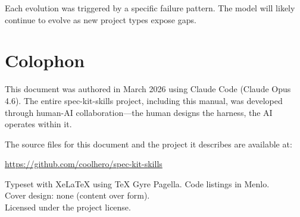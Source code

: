 \documentclass[11pt,a4paper,openright,twoside]{report}
\begin{document}
Each evolution was triggered by a specific failure pattern. The model will likely continue to evolve as new project types expose gaps.



\chapter*{Colophon}

This document was authored in March 2026 using Claude Code (Claude Opus 4.6). The entire spec-kit-skills project, including this manual, was developed through human-AI collaboration---the human designs the harness, the AI operates within it.

The source files for this document and the project it describes are available at:

\begin{center}
\url{https://github.com/coolhero/spec-kit-skills}
\end{center}

\vfill
{\small
Typeset with XeLaTeX using TeX Gyre Pagella. Code listings in Menlo.\\
Cover design: none (content over form).\\
Licensed under the project license.
}
\end{document}
